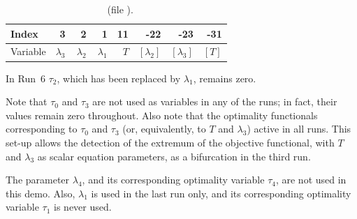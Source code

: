 \documentclass[12pt]{report}
\begin{document}
\begin{table}[htbp]
\begin{center}
\begin{tabular}{| l | r | r | r | r | r | r | r |}
\hline
  Index& 3 & ~2 & ~1 & 11  & -22 & -23 & -31 \\
\hline
  Variable& $\lambda_3$ & $\lambda_2$ & $\lambda_1$ & $T$  
  & $[\lambda_2]$ & $[\lambda_3]$ & $[T]$ \\
\hline
\end{tabular}
\caption{~ (file ).}
\label{tbl:demo_ops_3}
\end{center}
\end{table}


In Run~6 $\tau_2$, which has been replaced by $\lambda_1$, remains zero.


Note that $\tau_0$ and $\tau_3$ are not used as variables in any
of the runs; in fact, their values remain zero throughout.
Also note that the optimality functionals corresponding to 
$\tau_0$ and $\tau_3$ (or, equivalently, to $T$ and $\lambda_3$) 
 active in all runs.
This set-up allows the detection of the extremum of the objective functional,
with $T$ and $\lambda_3$ as scalar equation parameters,
as a bifurcation in the third run.

The parameter $\lambda_4$, and its corresponding optimality variable $\tau_4$,
are not used in this demo.
Also, $\lambda_1$ is used in the last run only, and its corresponding 
optimality variable $\tau_1$ is never used.
\end{document}
